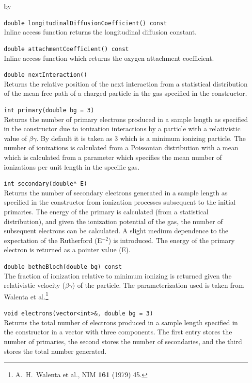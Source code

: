 \documentclass[twoside]{article}
\newcommand{\entrylabel}[1]{\mbox{\textbf{{#1}}}\hfil}%
\newenvironment{entry}
{\begin{list}{}%
    {\renewcommand{\makelabel}{\entrylabel}%
     \setlength{\labelwidth}{90pt}%
     \setlength{\leftmargin}{\labelwidth}
     \advance\leftmargin by \labelsep%
      }%
    }%
  {\end{list}}
\newcommand{\Entrylabel}[1]%
{\raisebox{0pt}[1ex][0pt]{\makebox[\labelwidth][l]%
    {\parbox[t]{\labelwidth}{\hspace{0pt}\textbf{{#1}}}}}}
\newenvironment{Entry}%
{\renewcommand{\entrylabel}{\Entrylabel}\begin{entry}}%
  {\end{entry}}
\begin{document}
\begin{Entry}
  \verb+double longitudinalDiffusionCoefficient() const+\\
  Inline access function returns the longitudinal diffusion constant.

  \verb+double attachmentCoefficient() const+\\
  Inline access function which returns the oxygen attachment
  coefficient.

  \verb+double nextInteraction()+\\
  Returns the relative position of the next interaction from
  a statistical distribution of the mean free path of a charged
  particle in the gas specified in the constructor.

  \verb+int primary(double bg = 3)+\\
  Returns the number of primary electrons produced in a sample length
  as specified in the constructor due to ionization
  interactions by a particle with a relativistic value of $\beta \gamma$.  
  By default it is taken as 3 which is a minimum ionizing particle.  
  The number of ionizations is calculated from a Poissonian distribution 
  with a mean which is calculated from a parameter which specifies the
  mean number of ionizations per unit length in the specific gas.
 
  \verb+int secondary(double* E)+\\
  Returns the number of secondary electrons generated in a sample length
  as specified in the constructor from ionization processes subsequent
  to the initial primaries.  The energy of the primary is
  calculated (from a statistical distribution), and given the 
  ionization potential of the gas, the number
  of subsequent electrons can be calculated.  A slight medium dependence
  to the expectation of the Rutherford (E$^{-2}$) is introduced.
  The energy of the primary electron is returned as a pointer value (E).

  \verb+double betheBloch(double bg) const+\\
  The fraction of ionization relative to minimum ionizing is returned
  given the relativistic velocity ($\beta \gamma$) of the
  particle.  The parameterization used is taken from Walenta
  et al.\footnote{A.~H.~Walenta et al., NIM {\bf 161} (1979) 45.}

  \verb+void electrons(vector<int>&, double bg = 3)+\\
  Returns the total number of electrons produced in a sample
  length specified in the constructor in a vector with three components.
  The first entry stores the number of primaries, the second stores the
  number of secondaries, and the third stores the total number generated.


\end{Entry}
\end{document}

